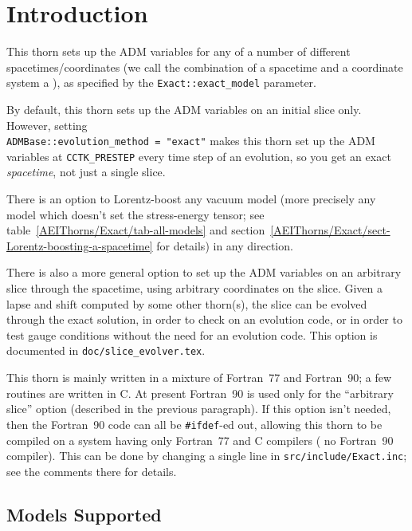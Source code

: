 
\section{Introduction}

This thorn sets up the ADM variables for any of a number of
different spacetimes/coordinates (we call the combination of a
spacetime and a coordinate system a ), as specified by the
\verb|Exact::exact_model| parameter.

By default, this thorn sets up the ADM variables on an initial
slice only.  However, setting\\
\verb|ADMBase::evolution_method = "exact"|
makes this thorn set up the ADM variables at \verb|CCTK_PRESTEP|
every time step of an evolution, so you get an exact {\em spacetime\/},
not just a single slice.

There is an option to Lorentz-boost any vacuum model
(more precisely any model which doesn't set the stress-energy tensor;
see table~\ref{AEIThorns/Exact/tab-all-models} and
section~\ref{AEIThorns/Exact/sect-Lorentz-boosting-a-spacetime}
for details) in any direction.

There is also a more general option to set up the ADM variables
on an arbitrary slice through the spacetime, using arbitrary
coordinates on the slice.  Given a lapse and shift computed by some
other thorn(s), the slice can be evolved through the exact solution,
in order to check on an evolution code, or in order to test gauge
conditions without the need for an evolution code.  This option is
documented in \verb|doc/slice_evolver.tex|.

This thorn is mainly written in a mixture of Fortran~77 and Fortran~90;
a few routines are written in C.  At present Fortran~90 is used only
for the ``arbitrary slice'' option (described in the previous paragraph).
If this option isn't needed, then the Fortran~90 code can all be
\verb|#ifdef|-ed out, allowing this thorn to be compiled on a system
having only Fortran~77 and C compilers (\ie{} no Fortran~90 compiler).
This can be done by changing a single line in \verb|src/include/Exact.inc|;
see the comments there for details.


\subsection{Models Supported}

